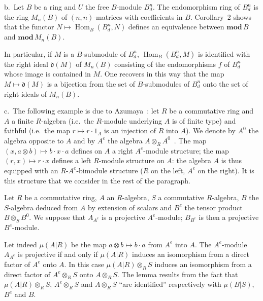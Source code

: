 b.\ Let $B$ be a ring and $U$ the free $B$-module $B_d^n$.  The
endomorphism ring of $B_d^n$ is the ring $M_n(B)$ of $(n,n)$-matrices
with coefficients in $B$.  Corollary~2 shows that the functor
$N\mapsto\operatorname{Hom}_B(B_d^n,N)$ defines an equivalence between
$\mathbf{mod}\,B$ and $\mathbf{mod}\,M_n(B)$.

In particular, if $M$ is a $B$-submodule of $B_d^n$,
$\operatorname{Hom}_B(B_d^n,M)$ is identified with the right ideal
$\mathfrak d(M)$ of $M_n(B)$ consisting of the endomorphisms $f$ of
$B_d^n$ whose image is contained in $M$.  One recovers in this way that
the map $M\mapsto\mathfrak d(M)$ is a bijection from the set of
$B$-submodules of $B_d^n$ onto the set of right ideals of $M_n(B)$.

c.\ The following example is due to Azumaya~\cite{azumaya-2}:
let $R$ be a commutative ring and $A$ a finite $R$-algebra (i.e.\ the
$R$-module underlying $A$ is of finite type) and faithful (i.e.\ the
map $r\mapsto r\cdot 1_A$ is an injection of $R$ into $A$).  We denote
by $A^0$ the algebra opposite to $A$ and by $A^e$ the algebra
$A\otimes_R A^0$~\cite{cartan-eilenberg}.  The map
$(x,a\otimes b)\mapsto b\cdot x\cdot a$ defines on $A$ a right
$A^e$-module structure; the map $(r,x)\mapsto r\cdot x$ defines a left
$R$-module structure on $A$: the algebra $A$ is thus equipped with an
$R$-$A^e$-bimodule structure ($R$ on the left, $A^e$ on the
right).  It is this structure that we consider in the rest of the
paragraph.

\begin{lemma}
Let $R$ be a commutative ring, $A$ an $R$-algebra, $S$ a commutative
$R$-algebra, $B$ the $S$-algebra deduced from $A$ by extension of
scalars and $B^e$ the tensor product $B\otimes_S B^0$.  We suppose that
$A_{A^e}$ is a projective $A^e$-module; $B_{B^e}$ is then a projective
$B^e$-module.
\end{lemma}

Let indeed $\mu(A|R)$ be the map $a\otimes b\mapsto b\cdot a$ from
$A^e$ into $A$.  The $A^e$-module $A_{A^e}$ is projective if and only
if $\mu(A|R)$ induces an isomorphism from a direct factor of $A^e$
onto $A$.  In this case $\mu(A|R)\otimes_R S$ induces an isomorphism
from a direct factor of $A^e\otimes_R S$ onto $A\otimes_R S$.  The
lemma results from the fact that $\mu(A|R)\otimes_R S$,
$A^e\otimes_R S$ and $A\otimes_R S$ ``are identified'' respectively
with $\mu(B|S)$, $B^e$ and $B$.

